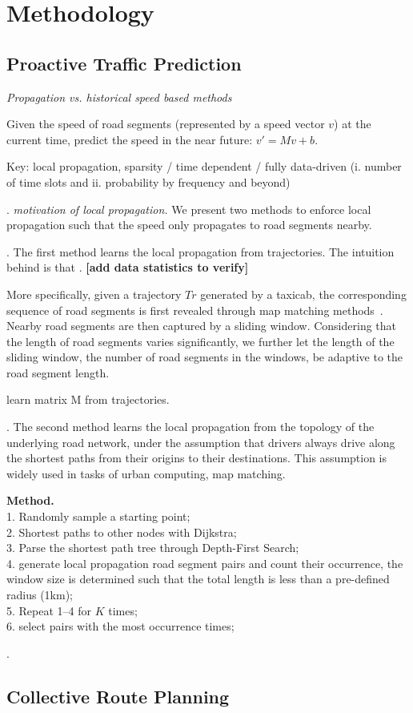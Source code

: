 \section{Methodology}
\label{sec-method}


\subsection{Proactive Traffic Prediction}
\label{subsec-proactive}

{\em Propagation vs. historical speed based methods}

Given the speed of road segments (represented by a speed vector $v$) at the current time, predict the speed in the near future: $v'=Mv+b$.

Key: local propagation, \ie sparsity / time dependent / fully data-driven (i. number of time slots and ii. probability by frequency and beyond)


. 
{\em motivation of local propagation.}
We present two methods to enforce local propagation such that the speed only propagates to road segments nearby.

.
The first method learns the local propagation from trajectories. The intuition behind is that {\em }. {\bf [add data statistics to verify]}

More specifically, given a trajectory $Tr$ generated by a taxicab, the corresponding sequence of road segments is first revealed through map matching methods~\cite{Newson2009MM}. Nearby road segments are then captured by a sliding window. Considering that the length of road segments varies significantly, we further let the length of the sliding window, \ie the number of road segments in the windows, be adaptive to the road segment length.

\begin{example}
learn matrix M from trajectories.
\end{example}

.
The second method learns the local propagation from the topology of the underlying road network, under the assumption that drivers always drive along the shortest paths from their origins to their destinations. This assumption is widely used in tasks of urban computing, \eg map matching.

{\bf Method.} \\
1. Randomly sample a starting point; \\
2. Shortest paths to other nodes with Dijkstra; \\
3. Parse the shortest path tree through Depth-First Search; \\
4. generate local propagation road segment pairs and count their occurrence, the window size is determined such that the total length is less than a pre-defined radius (1km); \\
5. Repeat 1--4 for $K$ times; \\
6. select pairs with the most occurrence times;


.



\subsection{Collective Route Planning}
\label{subsec-route}

